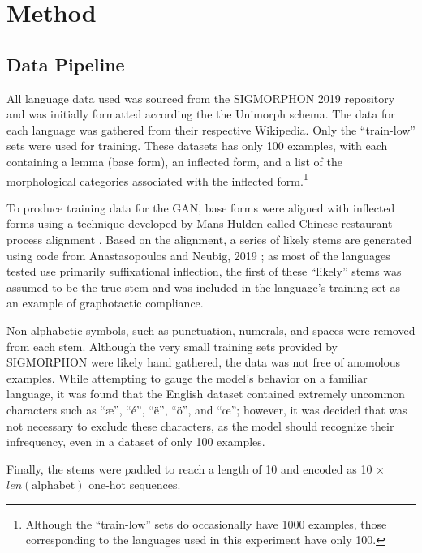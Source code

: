 \documentclass{article}
\begin{document}
  \section{Method}
    \subsection{Data Pipeline}
      All language data used was sourced from the SIGMORPHON 2019 repository and was initially formatted according the the Unimorph schema. The data for each language was gathered from their respective Wikipedia. Only the ``train-low'' sets were used for training. These datasets has only 100 examples, with each containing a lemma (base form), an inflected form, and a list of the morphological categories associated with the inflected form.\footnote{Although the ``train-low'' sets do occasionally have 1000 examples, those corresponding to the languages used in this experiment have only 100.} 
    
      To produce training data for the GAN, base forms were aligned with inflected forms using a technique developed by Mans Hulden called Chinese restaurant process alignment \cite{crpalign}. Based on the alignment, a series of likely stems are generated using code from Anastasopoulos and Neubig, 2019 \cite{CMU}; as most of the languages tested use primarily suffixational inflection, the first of these ``likely'' stems was assumed to be the true stem and was included in the language's training set as an example of graphotactic compliance.

      Non-alphabetic symbols, such as punctuation, numerals, and spaces were removed from each stem. Although the very small training sets provided by SIGMORPHON were likely hand gathered, the data was not free of anomolous examples. While attempting to gauge the model's behavior on a familiar language, it was found that the English dataset contained extremely uncommon characters such as ``æ'', ``é'', ``ë'', ``ö'', and ``œ''; however, it was decided that was not necessary to exclude these characters, as the model should recognize their infrequency, even in a dataset of only 100 examples.

      Finally, the stems were padded to reach a length of 10 and encoded as 10 $\times$ $len(\textrm{alphabet})$ one-hot sequences.
\end{document}
